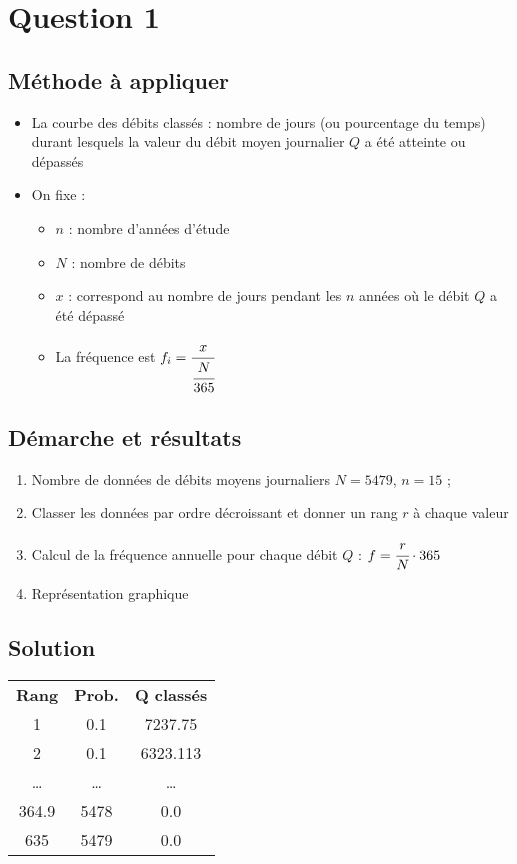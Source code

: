 \section{Question 1}
\subsection{Méthode à appliquer}
\begin{itemize}
    \item La courbe des débits classés : nombre de jours (ou pourcentage du temps) durant lesquels la valeur du débit moyen journalier $Q$ a été atteinte ou dépassés
    \item On fixe : \\
    \begin{itemize}
        \item $n$ : nombre d'années d'étude
        \item $N$ : nombre de débits 
        \item $x$ : correspond au nombre de jours pendant les $n$ années où le débit $Q$ a été dépassé
        \item La fréquence est $f_i = \cfrac{x}{\cfrac{N}{365}}$
    \end{itemize}
\end{itemize}

\subsection{Démarche et résultats}
\begin{enumerate}
    \item Nombre de données de débits moyens journaliers $N=5479$, $n=15$ ;
    \item Classer les données par ordre décroissant et donner un rang $r$ à chaque valeur
    \item Calcul de la fréquence annuelle pour chaque débit $Q$ : $f = \cfrac{r}{N}\cdot 365$
    \item Représentation graphique
\end{enumerate}

\subsection{Solution}
\begin{tabular}{|ccc|}
    \hline
    \textbf{Rang} & \textbf{Prob.} & \textbf{Q classés} \\
    1             & 0.1           & 7237.75             \\
    2             & 0.1           & 6323.113            \\
    \dots         & \dots         & \dots               \\
    364.9         & 5478          & 0.0                 \\
    635           & 5479          & 0.0                 \\
    \hline
\end{tabular}

